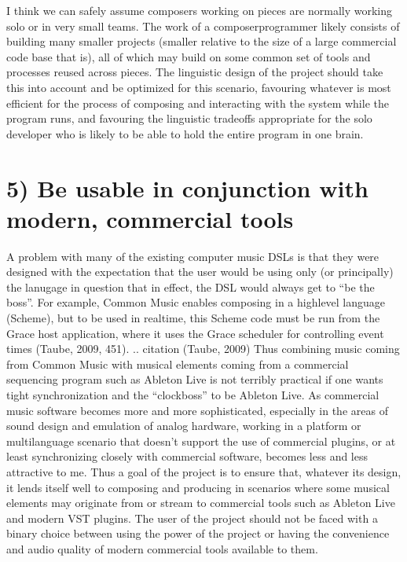 \documentclass[letterpaper,10pt,english]{sphinxmanual}
\begin{document}
\sphinxAtStartPar
I think we can safely assume composers working on pieces are normally working solo or in very small teams.
The work of a composer\sphinxhyphen{}programmer likely consists of building many smaller projects (smaller relative to the size of a large
commercial code base that is), all of which may build on some common set of tools and processes reused across pieces.
The linguistic design of the project should take this into account and be optimized for this scenario,
favouring whatever is most efficient for the process of composing and interacting with the system while the program runs,
and favouring the linguistic tradeoffs appropriate for the solo developer who is likely to be able to
hold the entire program in one brain.


\section{5) Be usable in conjunction with modern, commercial tools}
\label{\detokenize{goals:be-usable-in-conjunction-with-modern-commercial-tools}}
\sphinxAtStartPar
A problem with many of the existing computer music DSLs is that they were designed with the
expectation that the user would be using only (or principally) the lanugage in question \sphinxhyphen{} that in effect,
the DSL would always get to “be the boss”.
For example, Common Music enables composing in a high\sphinxhyphen{}level language (Scheme), but to be used in real\sphinxhyphen{}time,
this Scheme code must be run from the Grace host application, where it uses the Grace scheduler for
controlling event times (Taube, 2009, 451).
.. citation (Taube, 2009)
Thus combining music coming from Common Music with musical elements coming from a commercial sequencing program such as
Ableton Live is not terribly practical if one wants tight synchronization and the “clock\sphinxhyphen{}boss” to be Ableton Live.
As commercial music software becomes more and more sophisticated, especially in the areas of sound design
and emulation of analog hardware, working in a platform or multi\sphinxhyphen{}language scenario that doesn’t support
the use of commercial plugins, or at least synchronizing closely with commercial software, becomes less and less attractive to me.
Thus a goal of the project is to ensure that, whatever its design, it lends itself well to composing and
producing in scenarios where some musical elements may originate from or stream to commercial tools such
as Ableton Live and modern VST plugins.
The user of the project should not be faced with a binary choice between using the power of the project or
having the convenience and audio quality of modern commercial tools available to them.
\end{document}
